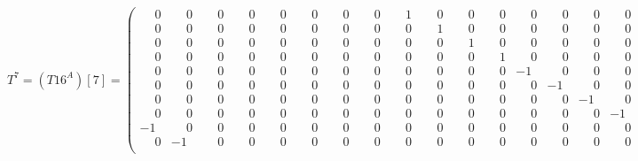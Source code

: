 \documentclass[10pt]{article}
\begin{document}
\[
T^{7} = (T16^A)[7] = \left(\begin{smallmatrix}
\phantom{-}0 & \phantom{-}0 & \phantom{-}0 & \phantom{-}0 & \phantom{-}0 & \phantom{-}0 & \phantom{-}0 & \phantom{-}0 & \phantom{-}1 & \phantom{-}0 & \phantom{-}0 & \phantom{-}0 & \phantom{-}0 & \phantom{-}0 & \phantom{-}0 & \phantom{-}0 \\
\phantom{-}0 & \phantom{-}0 & \phantom{-}0 & \phantom{-}0 & \phantom{-}0 & \phantom{-}0 & \phantom{-}0 & \phantom{-}0 & \phantom{-}0 & \phantom{-}1 & \phantom{-}0 & \phantom{-}0 & \phantom{-}0 & \phantom{-}0 & \phantom{-}0 & \phantom{-}0 \\
\phantom{-}0 & \phantom{-}0 & \phantom{-}0 & \phantom{-}0 & \phantom{-}0 & \phantom{-}0 & \phantom{-}0 & \phantom{-}0 & \phantom{-}0 & \phantom{-}0 & \phantom{-}1 & \phantom{-}0 & \phantom{-}0 & \phantom{-}0 & \phantom{-}0 & \phantom{-}0 \\
\phantom{-}0 & \phantom{-}0 & \phantom{-}0 & \phantom{-}0 & \phantom{-}0 & \phantom{-}0 & \phantom{-}0 & \phantom{-}0 & \phantom{-}0 & \phantom{-}0 & \phantom{-}0 & \phantom{-}1 & \phantom{-}0 & \phantom{-}0 & \phantom{-}0 & \phantom{-}0 \\
\phantom{-}0 & \phantom{-}0 & \phantom{-}0 & \phantom{-}0 & \phantom{-}0 & \phantom{-}0 & \phantom{-}0 & \phantom{-}0 & \phantom{-}0 & \phantom{-}0 & \phantom{-}0 & \phantom{-}0 & -1 & \phantom{-}0 & \phantom{-}0 & \phantom{-}0 \\
\phantom{-}0 & \phantom{-}0 & \phantom{-}0 & \phantom{-}0 & \phantom{-}0 & \phantom{-}0 & \phantom{-}0 & \phantom{-}0 & \phantom{-}0 & \phantom{-}0 & \phantom{-}0 & \phantom{-}0 & \phantom{-}0 & -1 & \phantom{-}0 & \phantom{-}0 \\
\phantom{-}0 & \phantom{-}0 & \phantom{-}0 & \phantom{-}0 & \phantom{-}0 & \phantom{-}0 & \phantom{-}0 & \phantom{-}0 & \phantom{-}0 & \phantom{-}0 & \phantom{-}0 & \phantom{-}0 & \phantom{-}0 & \phantom{-}0 & -1 & \phantom{-}0 \\
\phantom{-}0 & \phantom{-}0 & \phantom{-}0 & \phantom{-}0 & \phantom{-}0 & \phantom{-}0 & \phantom{-}0 & \phantom{-}0 & \phantom{-}0 & \phantom{-}0 & \phantom{-}0 & \phantom{-}0 & \phantom{-}0 & \phantom{-}0 & \phantom{-}0 & -1 \\
-1 & \phantom{-}0 & \phantom{-}0 & \phantom{-}0 & \phantom{-}0 & \phantom{-}0 & \phantom{-}0 & \phantom{-}0 & \phantom{-}0 & \phantom{-}0 & \phantom{-}0 & \phantom{-}0 & \phantom{-}0 & \phantom{-}0 & \phantom{-}0 & \phantom{-}0 \\
\phantom{-}0 & -1 & \phantom{-}0 & \phantom{-}0 & \phantom{-}0 & \phantom{-}0 & \phantom{-}0 & \phantom{-}0 & \phantom{-}0 & \phantom{-}0 & \phantom{-}0 & \phantom{-}0 & \phantom{-}0 & \phantom{-}0 & \phantom{-}0 & \phantom{-}0 \\

\end{smallmatrix}\]
\end{document}

